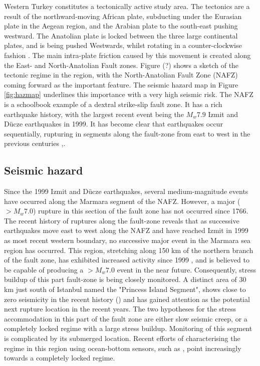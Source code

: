 \documentclass[../Text/00main.tex]{subfiles}
\begin{document}
Western Turkey constitutes a tectonically active study area. The tectonics are a result of the northward-moving African plate, subducting under the Eurasian plate in the Aegean region, and the Arabian plate to the south-east pushing westward. The Anatolian plate is locked between the three large continental plates, and is being pushed Westwards, whilst rotating in a counter-clockwise fashion \cite{rotstein1984counterclockwise}. The main intra-plate friction caused by this movement is created along the East- and North-Anatolian Fault zones. Figure (?) shows a sketch of the tectonic regime in the region, with the North-Anatolian Fault Zone (NAFZ) coming forward as the important feature. The seismic hazard map in Figure \ref{fig:hazmap} underlines this importance with a very high seismic risk. The NAFZ is a schoolbook example of a dextral strike-slip fault zone. It has a rich earthquake history, with the largest recent event being the $M_w 7.9$ Izmit and Dücze earthquakes in 1999. It has become clear that earthquakes occur sequentially, rupturing in segments along the fault-zone from east to west in the previous centuries \cite{bohnhoff_earthquake_2013},\cite{bulut_magnitudes_2019}. 

\subsection{Seismic hazard}

Since the 1999 Izmit and Dücze earthquakes, several medium-magnitude events have occurred along the Marmara segment of the NAFZ. However, a major ($> M_w 7.0$) rupture in this section of the fault zone has not occurred since 1766. The recent history of ruptures along the fault-zone reveals that as successive earthquakes move east to west along the NAFZ and have reached Izmit in 1999 as most recent western boundary, no successive major event in the Marmara sea region has occurred. This region, stretching along 150 km of the northern branch of the fault zone, has exhibited increased activity since 1999 \cite{bohnhoff_earthquake_2013}, and is believed to be capable of producing a $> M_w 7.0$ event in the near future. Consequently, stress buildup of this part fault-zone is being closely monitored. A distinct area of 30 km just south of Istanbul named the "Princess Island Segment", shows close to zero seismicity in the recent history (\cite{bohnhoff_earthquake_2013}) and has gained attention as the potential next rupture location in the recent years. The two hypotheses for the stress accommodation in this part of the fault zone are either slow seismic creep, or a completely locked regime with a large stress buildup. Monitoring of this segment is complicated by its submerged location. Recent efforts of characterising the regime in this region using ocean-bottom sensors, such as \cite{lange2019interseismic}, point increasingly towards a completely locked regime.
\end{document}
